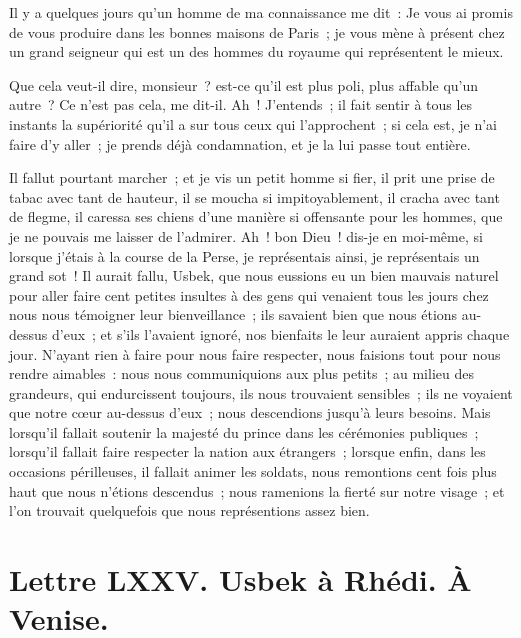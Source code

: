 \documentclass[french,twoside]{book} %
\newcommand{\dateline}[1]{\medskip{\RaggedLeft{#1}\par}\bigskip}
\begin{document}
\noindent Il y a quelques jours qu’un homme de ma connaissance me dit : Je vous ai promis de vous produire dans les bonnes maisons de Paris ; je vous mène à présent chez un grand seigneur qui est un des hommes du royaume qui représentent le mieux.\par
Que cela veut-il dire, monsieur ? est-ce qu’il est plus poli, plus affable qu’un autre ? Ce n’est pas cela, me dit-il. Ah ! J’entends ; il fait sentir à tous les instants la supériorité qu’il a sur tous ceux qui l’approchent ; si cela est, je n’ai faire d’y aller ; je prends déjà condamnation, et je la lui passe tout entière.\par
Il fallut pourtant marcher ; et je vis un petit homme si fier, il prit une prise de tabac avec tant de hauteur, il se moucha si impitoyablement, il cracha avec tant de flegme, il caressa ses chiens d’une manière si offensante pour les hommes, que je ne pouvais me laisser de l’admirer. Ah ! bon Dieu ! dis-je en moi-même, si lorsque j’étais à la course de la Perse, je représentais ainsi, je représentais un grand sot ! Il aurait fallu, Usbek, que nous eussions eu un bien mauvais naturel pour aller faire cent petites insultes à des gens qui venaient tous les jours chez nous nous témoigner leur bienveillance ; ils savaient bien que nous étions au-dessus d’eux ; et s’ils l’avaient ignoré, nos bienfaits le leur auraient appris chaque jour. N’ayant rien à faire pour nous faire respecter, nous faisions tout pour nous rendre aimables : nous nous communiquions aux plus petits ; au milieu des grandeurs, qui endurcissent toujours, ils nous trouvaient sensibles ; ils ne voyaient que notre cœur au-dessus d’eux ; nous descendions jusqu’à leurs besoins. Mais lorsqu’il fallait soutenir la majesté du prince dans les cérémonies publiques ; lorsqu’il fallait faire respecter la nation aux étrangers ; lorsque enfin, dans les occasions périlleuses, il fallait animer les soldats, nous remontions cent fois plus haut que nous n’étions descendus ; nous ramenions la fierté sur notre visage ; et l’on trouvait quelquefois que nous représentions assez bien.\par

\dateline{De Paris, le 10 de la lune de Saphar, 1715.}
\section[{Lettre LXXV. Usbek à Rhédi. À Venise.}]{Lettre LXXV. Usbek à Rhédi. À Venise.}\renewcommand{\leftmark}{Lettre LXXV. Usbek à Rhédi. À Venise.}
\end{document}
